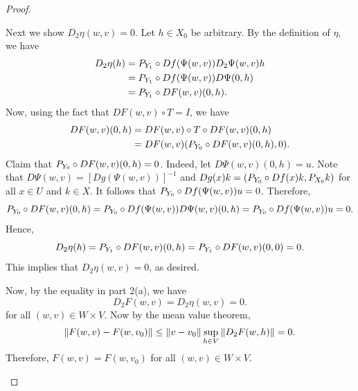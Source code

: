 \documentclass[a4paper]{article}
\begin{document}
\begin{proof}
{\begin{enumerate}
            Next we show $D_2 \eta (w, v) = 0$. Let $h \in X_0$ be
            arbitrary. By the definition of $\eta$, we have
            \[
              \begin{aligned}
                D_2 \eta (h)
                 & = {P_{Y_1}} \circ Df(\Psi(w, v)) D_2 \Psi(w, v) h \\
                 & = {P_{Y_1}} \circ Df(\Psi(w, v)) D\Psi(0, h)      \\
                 & = {P_{Y_1}} \circ DF(w, v) (0, h).
              \end{aligned}
            \]
            Now, using the fact that $DF(w, v) \circ T = I$, we have
            \[
              \begin{aligned}
                DF(w, v) (0, h)
                 & = DF(w, v) \circ T \circ DF(w, v) (0, h)  \\
                 & = DF(w, v) ({P_{Y_0}} \circ DF(w, v)(0, h), 0).
              \end{aligned}
            \]
            Claim that ${P_{Y_0}} \circ DF(w, v) (0, h) = 0$. Indeed, let
            $D\Psi(w, v) (0, h) = u$. Note that $D\Psi(w, v) = [Dg(\Psi(w,
            v))]^{-1}$ and $Dg(x) k = ({P_{Y_0}} \circ Df(x) k, {P_{X_0}} k)$ for all
            $x \in U$ and $k \in X$. It follows that ${P_{Y_0}} \circ Df(\Psi(w,
            v)) u = 0$. Therefore,
            \[
              {P_{Y_0}} \circ DF(w, v) (0, h) = {P_{Y_0}} \circ Df(\Psi(w, v))
              D\Psi(w, v) (0, h) = {P_{Y_0}} \circ Df(\Psi(w, v)) u = 0.
            \]
            Hence,
            \[
              D_2 \eta (h) = {P_{Y_1}} \circ DF(w, v) (0, h)
              = {P_{Y_1}} \circ DF(w, v)(0, 0)
              = 0.
            \]
            This implies that $D_2 \eta(w, v) = 0$, as desired.

            Now, by the equality in part 2(a), we have
            \[
              D_2 F(w, v) = D_2 \eta(w, v) = 0.
            \]
            for all $(w, v) \in W \times V$. Now by the mean value
            theorem,
            \[
              \begin{aligned}
                \left\lVert F(w, v) - F(w, v_0)\right\rVert
                \leq \left\lVert v - v_0\right\rVert \sup_{h \in V} \left\lVert D_2 F(w, h)\right\rVert
                = 0.
              \end{aligned}
            \]
            Therefore, $F(w, v) = F(w, v_0)$ for all $(w, v) \in W \times
            V$.


\end{enumerate}}
\end{proof}
\end{document}
